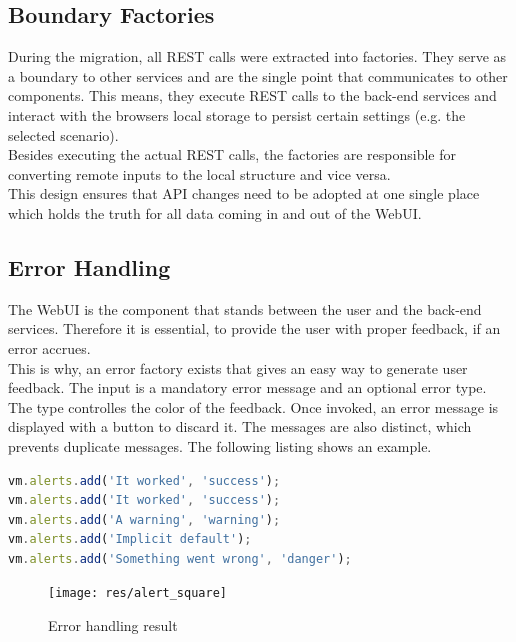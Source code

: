 \subsection{Boundary Factories}
During the migration, all REST calls were extracted into factories. They serve as a boundary to other services and are the single point that communicates to other components. This means, they execute REST calls to the back-end services and interact with the browsers local storage to persist certain settings (e.g. the selected scenario).\\
Besides executing the actual REST calls, the factories are responsible for converting remote inputs to the local structure and vice versa.\\
This design ensures that API changes need to be adopted at one single place which holds the truth for all data coming in and out of the WebUI.


\subsection{Error Handling}
The WebUI is the component that stands between the user and the back-end services. Therefore it is essential, to provide the user with proper feedback, if an error accrues.\\
This is why, an error factory exists that gives an easy way to generate user feedback. The input is a mandatory error message and an optional error type. The type controlles the color of the feedback. Once invoked, an error message is displayed with a button to discard it. The messages are also distinct, which prevents duplicate messages. The following listing shows an example. 
\begin{lstlisting}[language=javascript, caption=Error handling]
vm.alerts.add('It worked', 'success');
vm.alerts.add('It worked', 'success');
vm.alerts.add('A warning', 'warning');
vm.alerts.add('Implicit default');
vm.alerts.add('Something went wrong', 'danger');
\end{lstlisting}
\begin{figure}[H]
	\centering\texttt{[image: res/alert\_square]}
	\caption{Error handling result}
\end{figure}



